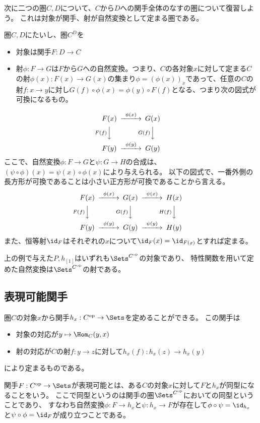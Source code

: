 \documentclass[uplatex]{jsarticle}
\begin{document}
次に二つの圏$C, D$について、$C$から$D$への関手全体のなすの圏について復習しよう。
これは対象が関手、射が自然変換として定まる圏である。
\begin{dfn}
圏$C, D$にたいし、圏$C^D$を
\begin{itemize}
\item 対象は関手$F:D\to C$
\item 射$\phi:F\to G$は$F$から$G$への自然変換。つまり、$C$の各対象$x$に対して定まる$C$の射$\phi(x):F(x)\to G(x)$の集まり$\phi=(\phi(x))_x$であって、任意の$C$の射$f:x\to y$に対し$G(f)\circ\phi(x)=\phi(y)\circ F(f)$となる、つまり次の図式が可換になるもの。
\end{itemize}
\[
\begin{CD}
F(x)@>\phi(x)>>G(x)\\
@VF(f)VV@VG(f)VV\\
F(y)@>\phi(y)>>G(y)
\end{CD}
\]
ここで、自然変換$\phi:F \to G$と$\psi:G\to H$の合成は、$(\psi\circ\phi)(x)=\psi(x)\circ \phi(x)$により与えられる。
以下の図式で、一番外側の長方形が可換であることは小さい正方形が可換であることから言える。
\[
\begin{CD}
F(x)@>\phi(x)>>G(x)@>\psi(x)>>H(x)\\
@VF(f)VV@VG(f)VV@VH(f)VV\\
F(y)@>\phi(y)>>G(y)@>\psi(y)>>H(y)
\end{CD}
\]
また、恒等射$\id_F$はそれぞれの$x$について$\id_F(x)=\id_{F(x)}$とすれば定まる。
\end{dfn}

上の例で与えた$P, h_{[1]}$はいずれも$\Sets^{C^{\rm op}}$の対象であり、
特性関数を用いて定めた自然変換は$\Sets^{C^{\rm op}}$の射である。

\subsection{表現可能関手}
圏$C$の対象$x$から関手$h_x:C^{\rm op} \to \Sets$を定めることができる。
この関手は
\begin{itemize}
\item 対象の対応が$y \mapsto \Hom_C(y,x)$
\item 射の対応が$C$の射$f:y \to z$に対して$h_x(f):h_x(z) \to h_x(y)$
\end{itemize}
により定まるものである。

\begin{dfn}
関手$F:C^{\rm op}\to\Sets$が表現可能とは、ある$C$の対象$x$に対して$F$と$h_x$が同型になることをいう。
ここで同型というのは関手の圏$\Sets^{C^{\rm op}}$においての同型ということであり、
すなわち自然変換$\phi:F \to h_x$と$\psi:h_x \to F$が存在して$\phi\circ\psi=\id_{h_x}$と$\psi\circ\phi=\id_F$が成り立つことである。
\end{dfn}
\end{document}
